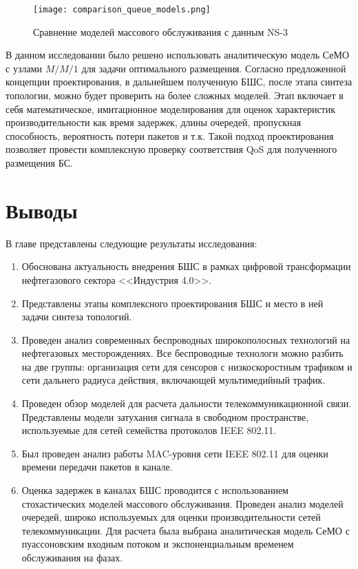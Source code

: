 \begin{figure}[h!]
  \centering
   \texttt{[image: comparison\_queue\_models.png]}
\caption{Сравнение моделей массового обслуживания с данным NS-3}
\label{fig:comparison_queue_models}
\end{figure}

В данном исследовании было решено использовать аналитическую модель СеМО с узлами $M/M/1$ для задачи оптимального размещения. Согласно предложенной концепции проектирования, в дальнейшем полученную БШС, после этапа синтеза топологии, можно будет проверить на более сложных моделей. Этап  включает в себя математическое, имитационное моделирования для оценок характеристик производительности как время задержек, длины очередей, пропускная способность, вероятность потери пакетов и т.к. Такой подход проектирования позволяет провести комплексную проверку соответствия QoS для полученного размещения БС.

\section{Выводы}
 
В главе представлены следующие результаты исследования:

\begin{enumerate}
  \item Обоснована актуальность внедрения БШС в рамках цифровой трансформации нефтегазового сектора <<Индустрия 4.0>>.
  \item Представлены этапы комплексного проектирования БШС и место в ней задачи синтеза топологий. 
  \item Проведен анализ современных беспроводных широкополосных технологий на нефтегазовых месторождениях. Все беспроводные технологи можно разбить на две группы: организация сети для сенсоров с низкоскоростным трафиком и сети дальнего радиуса действия, включающей мультимедийный трафик.
  \item Проведен обзор моделей для расчета дальности телекоммуникационной связи. Представлены модели затухания сигнала в свободном пространстве, используемые для сетей семейства протоколов IEEE 802.11.
  \item Был проведен анализ работы MAC-уровня сети IEEE 802.11 для оценки времени передачи пакетов в канале.
  \item Оценка задержек в каналах БШС проводится с использованием стохастических моделей массового обслуживания. Проведен анализ моделей очередей, широко используемых для оценки производительности сетей телекоммуникации. Для расчета была выбрана аналитическая модель СеМО с пуассоновским входным потоком и экспоненциальным временем обслуживания на фазах.
\end{enumerate}











\FloatBarrier
